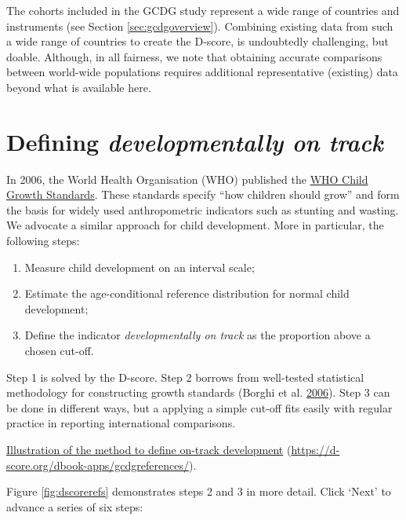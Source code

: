 \documentclass[
]{book}
\providecommand{\tightlist}{%
  \setlength{\itemsep}{0pt}\setlength{\parskip}{0pt}}
\begin{document}
The cohorts included in the GCDG study represent a wide range of countries and instruments (see Section \ref{sec:gcdgoverview}). Combining existing data from such a wide range of countries to create the D-score, is undoubtedly challenging, but doable. Although, in all fairness, we note that obtaining accurate comparisons between world-wide populations requires additional representative (existing) data beyond what is available here.

\hypertarget{sec:references}{%
\section{\texorpdfstring{Defining \emph{developmentally on track}}{Defining developmentally on track}}\label{sec:references}}

In 2006, the World Health Organisation (WHO) published the \href{https://www.who.int/childgrowth/publications/technical_report_pub/en/}{WHO Child Growth Standards}. These standards specify ``how children should grow'' and form the basis for widely used anthropometric indicators such as stunting and wasting. We advocate a similar approach for child development. More in particular, the following steps:

\begin{enumerate}
\def\labelenumi{\arabic{enumi}.}
\tightlist
\item
  Measure child development on an interval scale;
\item
  Estimate the age-conditional reference distribution for normal child development;
\item
  Define the indicator \emph{developmentally on track} as the proportion above a chosen cut-off.
\end{enumerate}

Step 1 is solved by the D-score. Step 2 borrows from well-tested statistical methodology for constructing growth standards (Borghi et al. \protect\hyperlink{ref-borghi2006}{2006}). Step 3 can be done in different ways, but a applying a simple cut-off fits easily with regular practice in reporting international comparisons.

\label{fig:dscorerefs}\href{https://d-score.org/dbook-apps/gcdgreferences/}{Illustration of the method to define on-track development} (\url{https://d-score.org/dbook-apps/gcdgreferences/}).



Figure \ref{fig:dscorerefs} demonstrates steps 2 and 3 in more detail. Click `Next' to advance a series of six steps:
\end{document}
